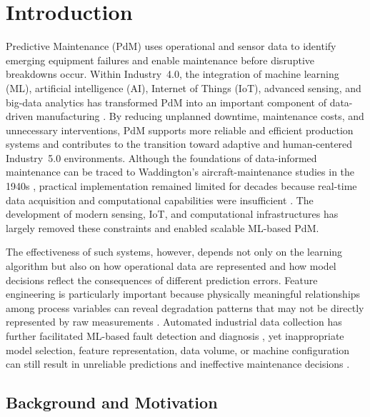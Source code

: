 \documentclass[final,5p, twocolumn]{elsarticle}
\begin{document}



\section{Introduction}

\color{blue}

Predictive Maintenance (PdM) uses operational and sensor data to identify emerging equipment failures and enable maintenance before disruptive breakdowns occur. Within Industry~4.0, the integration of machine learning (ML), artificial intelligence (AI), Internet of Things (IoT), advanced sensing, and big-data analytics has transformed PdM into an important component of data-driven manufacturing \cite{yan2017industrial,Rashid2023}. By reducing unplanned downtime, maintenance costs, and unnecessary interventions, PdM supports more reliable and efficient production systems and contributes to the transition toward adaptive and human-centered Industry~5.0 environments. Although the foundations of data-informed maintenance can be traced to Waddington's aircraft-maintenance studies in the 1940s \cite{hobbs2014british,force2019royal}, practical implementation remained limited for decades because real-time data acquisition and computational capabilities were insufficient \cite{ramamritham1993real,ayvaz2021predictive}. The development of modern sensing, IoT, and computational infrastructures has largely removed these constraints and enabled scalable ML-based PdM.

The effectiveness of such systems, however, depends not only on the learning algorithm but also on how operational data are represented and how model decisions reflect the consequences of different prediction errors. Feature engineering is particularly important because physically meaningful relationships among process variables can reveal degradation patterns that may not be directly represented by raw measurements \cite{nargesian2017learning}. Automated industrial data collection has further facilitated ML-based fault detection and diagnosis \cite{angelopoulos2019tackling}, yet inappropriate model selection, feature representation, data volume, or machine configuration can still result in unreliable predictions and ineffective maintenance decisions \cite{swearingen2007open}.

\subsection{Background and Motivation}
\end{document}
